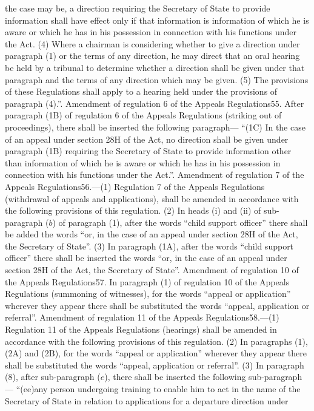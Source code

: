 \documentclass[a4paper]{article}
\begin{document}
the case may be, a direction requiring the Secretary of State to provide
information shall have effect only if that information is information of which
he is aware or which he has in his possession in connection with his functions
under the Act.
(4) Where a chairman is considering whether to give a direction under paragraph
(1) or the terms of any direction, he may direct that an oral hearing be held by
a tribunal to determine whether a direction shall be given under that paragraph
and the terms of any direction which may be given.
(5) The provisions of these Regulations shall apply to a hearing held under the
provisions of paragraph (4).”.
Amendment of regulation 6 of the Appeals Regulations55. After paragraph (1B) of
regulation 6 of the Appeals Regulations (striking out of proceedings), there
shall be inserted the following paragraph—
“(1C) In the case of an appeal under section 28H of the Act, no direction shall
be given under paragraph (1B) requiring the Secretary of State to provide
information other than information of which he is aware or which he has in his
possession in connection with his functions under the Act.”.
Amendment of regulation 7 of the Appeals Regulations56.—(1) Regulation 7 of the
Appeals Regulations (withdrawal of appeals and applications), shall be amended
in accordance with the following provisions of this regulation.
(2) In heads (i) and (ii) of sub-paragraph ($b$) of paragraph (1), after the words
“child support officer” there shall be added the words “or, in the case of an
appeal under section 28H of the Act, the Secretary of State”.
(3) In paragraph (1A), after the words “child support officer” there shall be
inserted the words “or, in the case of an appeal under section 28H of the Act,
the Secretary of State”.
Amendment of regulation 10 of the Appeals Regulations57. In paragraph (1) of
regulation 10 of the Appeals Regulations (summoning of witnesses), for the words
“appeal or application” wherever they appear there shall be substituted the
words “appeal, application or referral”.
Amendment of regulation 11 of the Appeals Regulations58.—(1) Regulation 11 of
the Appeals Regulations (hearings) shall be amended in accordance with the
following provisions of this regulation.
(2) In paragraphs (1), (2A) and (2B), for the words “appeal or application”
wherever they appear there shall be substituted the words “appeal, application
or referral”.
(3) In paragraph (8), after sub-paragraph ($e$), there shall be inserted the
following sub-paragraph—
“(ee)any person undergoing training to enable him to act in the name of the
Secretary of State in relation to applications for a departure direction under
\end{document}
